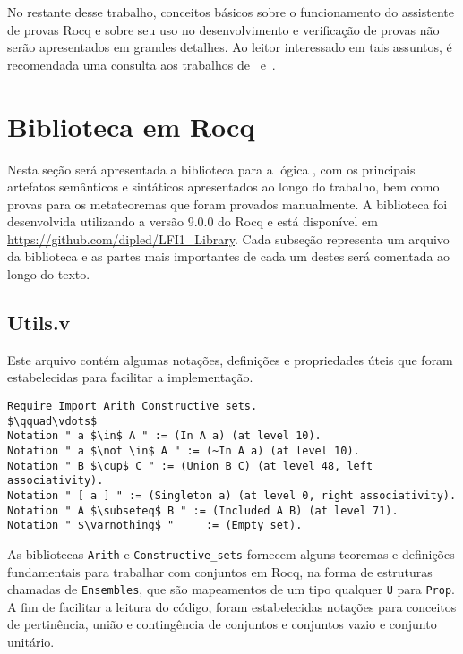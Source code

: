     No restante desse trabalho, conceitos básicos sobre o funcionamento do assistente de provas Rocq e sobre seu uso no desenvolvimento e verificação de provas não serão apresentados em grandes detalhes. Ao leitor interessado em tais assuntos, é recomendada uma consulta aos trabalhos de~ e~.

\section{Biblioteca em Rocq}\label{sec:biblioteca}
    Nesta seção será apresentada a biblioteca para a lógica \lfium{}, com os principais artefatos semânticos e sintáticos apresentados ao longo do trabalho, bem como provas para os metateoremas que foram provados manualmente. A biblioteca foi desenvolvida utilizando a versão 9.0.0 do Rocq e está disponível em \url{https://github.com/dipled/LFI1_Library}. Cada subseção representa um arquivo da biblioteca e as partes mais importantes de cada um destes será comentada ao longo do texto.

    \subsection{Utils.v}\label{sec:utils}

      Este arquivo contém algumas notações, definições e propriedades úteis que foram estabelecidas para facilitar a implementação.

      \begin{lstlisting}[name=Utils, frame=single, language=coq]
Require Import Arith Constructive_sets.
$\qquad\vdots$
Notation " a $\in$ A " := (In A a) (at level 10).
Notation " a $\not \in$ A " := (~In A a) (at level 10).
Notation " B $\cup$ C " := (Union B C) (at level 48, left associativity).
Notation " [ a ] " := (Singleton a) (at level 0, right associativity).
Notation " A $\subseteq$ B " := (Included A B) (at level 71). 
Notation " $\varnothing$ "     := (Empty_set).
      \end{lstlisting}

      As bibliotecas \texttt{Arith} e \texttt{Constructive\_sets} fornecem alguns teoremas e definições fundamentais para trabalhar com conjuntos em Rocq, na forma de estruturas chamadas de \texttt{Ensembles}, que são mapeamentos de um tipo qualquer \texttt{U} para \texttt{Prop}. A fim de facilitar a leitura do código, foram estabelecidas notações para conceitos de pertinência, união e contingência de conjuntos e conjuntos vazio e conjunto unitário.

